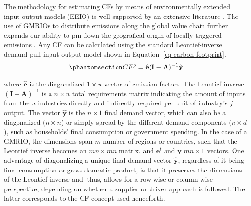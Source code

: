\documentclass[
  10pt,
  twocolumn]{aft}
\begin{document}
The methodology for estimating CFs by means of environmentally extended
input-output models (EEIO) is well-supported by an extensive literature
\citep{miller_input-output_2022, ivanova_mapping_2017, eurostat_manual_2015, eea_environmental_2013, martinezIdentifyingEnvironmentalFootprint2019}.
The use of GMRIOs to distribute emissions along the global value chain
further expands our ability to pin down the geografical origin of
locally triggered emissions
\citep{wiedmann_threescope_2021, wiedmann_concept_2016, remond-tiedrez_eu_2019}.
Any CF can be calculated using the standard Leontief-inverse demand-pull
input-output model shown in Equation~\ref{eq-carbon-footprint}.
\begin{equation}\phantomsection\label{eq-carbon-footprint}{
CF^p = \hat{\textbf{e}}(\textbf{I} - \textbf{A})^{-1}\hat{\textbf{y}} 
}\end{equation}

where \(\hat{\textbf{e}}\) is the diagonalized \(1 \times n\) vector of
emission factors. The Leontief inverse
\((\textbf{I} - \textbf{A})^{-1}\) is a \(n \times n\) total
requirements matrix indicating the amount of inputs from the \(n\)
industries directly and indirectly required per unit of industry's \(j\)
output. The vector \(\hat{\textbf{y}}\) is the \(n \times 1\) final
demand vector, which can also be a diagonalized (\(n \times n\)) or
simply spread by the different demand components (\(n \times d\)), such
as households' final consumption or government spending. In the case of
a GMRIO, the dimensions span \(m\) number of regions or countries, such
that the Leontief inverse becomes an \(mn \times mn\) matrix, and
\(\textbf{e}^t\) and \(\textbf{y}\) \(mn \times 1\) vectors. One
advantage of diagonalizing a unique final demand vector
\(\hat{\textbf{y}}\), regardless of it being final consumption or gross
domestic product, is that it preserves the dimensions of the Leontief
inverse and, thus, allows for a row-wise or column-wise perspective,
depending on whether a supplier or driver approach is followed. The
latter corresponds to the CF concept used henceforth.
\end{document}
